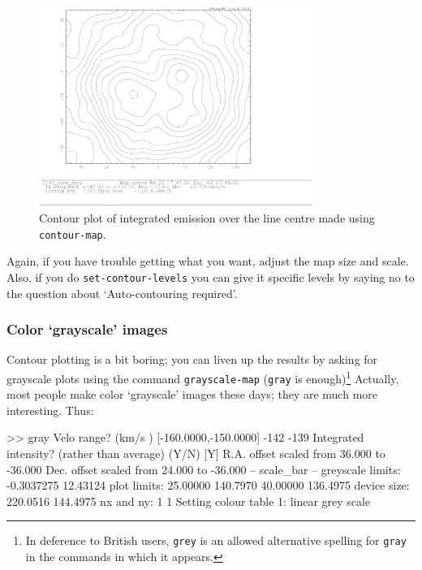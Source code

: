 \documentclass[11pt,twoside]{starlink}
\begin{document}
\begin{figure}[htb]
\centering
\includegraphics[width=0.8\textwidth]{sc8_cont}
\caption[Contour plot example]
{\small{Contour plot of integrated emission over the line centre made
using \texttt{contour-map}.}  }
\label{fig:specx_fig7}
\end{figure}

Again, if you have trouble getting what you want, adjust the map size
and scale.  Also, if you do \texttt{set-contour-levels} you can give it
specific levels by saying no to the question about `Auto-contouring
required'.

\subsubsection{Color `grayscale' images}
\label{sec:grayscale}
Contour plotting is a bit boring; you can liven up the results by
asking for grayscale plots using the command \texttt{grayscale-map}
({\tt{gray}} is enough)\footnote{In deference to British users, \texttt{grey} is an allowed alternative spelling for \texttt{gray} in the commands
in which it appears.}  Actually, most people make color `grayscale'
images these days; they are much more interesting. Thus:

\begin{terminalv}
>> gray
Velo range? (km/s  ) [-160.0000,-150.0000] -142 -139
Integrated intensity? (rather than average) (Y/N) [Y]
R.A. offset scaled from   36.000 to  -36.000
Dec. offset scaled from   24.000 to  -36.000
 -- scale_bar --
    greyscale limits:  -0.3037275       12.43124
    plot limits:         25.00000       140.7970       40.00000
  136.4975
    device size:         220.0516       144.4975
    nx and ny:                   1           1
Setting colour table 1: linear grey scale
\end{terminalv}
\end{document}
